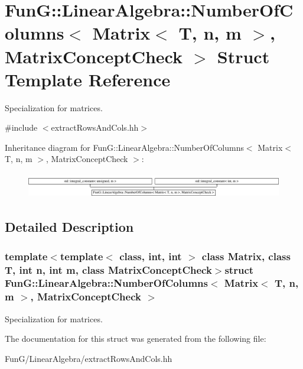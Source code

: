 \hypertarget{structFunG_1_1LinearAlgebra_1_1NumberOfColumns_3_01Matrix_3_01T_00_01n_00_01m_01_4_00_01MatrixConceptCheck_01_4}{\section{Fun\-G\-:\-:Linear\-Algebra\-:\-:Number\-Of\-Columns$<$ Matrix$<$ T, n, m $>$, Matrix\-Concept\-Check $>$ Struct Template Reference}
\label{structFunG_1_1LinearAlgebra_1_1NumberOfColumns_3_01Matrix_3_01T_00_01n_00_01m_01_4_00_01MatrixConceptCheck_01_4}
}


Specialization for matrices.  




{\ttfamily \#include $<$extract\-Rows\-And\-Cols.\-hh$>$}

Inheritance diagram for Fun\-G\-:\-:Linear\-Algebra\-:\-:Number\-Of\-Columns$<$ Matrix$<$ T, n, m $>$, Matrix\-Concept\-Check $>$\-:\begin{figure}[H]
\begin{center}
\leavevmode
\includegraphics[height=1.117764cm]{structFunG_1_1LinearAlgebra_1_1NumberOfColumns_3_01Matrix_3_01T_00_01n_00_01m_01_4_00_01MatrixConceptCheck_01_4}
\end{center}
\end{figure}


\subsection{Detailed Description}
\subsubsection*{template$<$template$<$ class, int, int $>$ class Matrix, class T, int n, int m, class Matrix\-Concept\-Check$>$struct Fun\-G\-::\-Linear\-Algebra\-::\-Number\-Of\-Columns$<$ Matrix$<$ T, n, m $>$, Matrix\-Concept\-Check $>$}

Specialization for matrices. 

The documentation for this struct was generated from the following file\-:\begin{DoxyCompactItemize}
\item 
Fun\-G/\-Linear\-Algebra/extract\-Rows\-And\-Cols.\-hh\end{DoxyCompactItemize}
